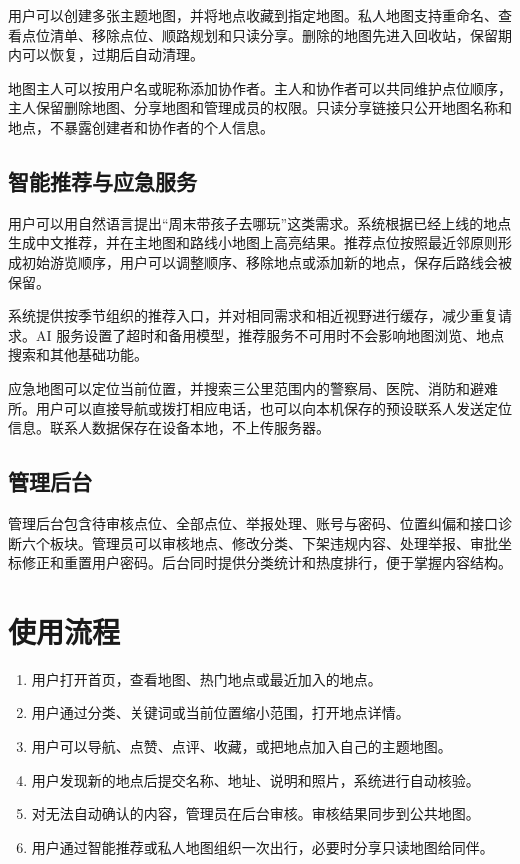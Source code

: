 \documentclass[UTF8,a4paper,12pt]{ctexart}
\begin{document}
用户可以创建多张主题地图，并将地点收藏到指定地图。私人地图支持重命名、查看点位清单、移除点位、顺路规划和只读分享。删除的地图先进入回收站，保留期内可以恢复，过期后自动清理。

地图主人可以按用户名或昵称添加协作者。主人和协作者可以共同维护点位顺序，主人保留删除地图、分享地图和管理成员的权限。只读分享链接只公开地图名称和地点，不暴露创建者和协作者的个人信息。

\subsection{智能推荐与应急服务}

用户可以用自然语言提出“周末带孩子去哪玩”这类需求。系统根据已经上线的地点生成中文推荐，并在主地图和路线小地图上高亮结果。推荐点位按照最近邻原则形成初始游览顺序，用户可以调整顺序、移除地点或添加新的地点，保存后路线会被保留。

系统提供按季节组织的推荐入口，并对相同需求和相近视野进行缓存，减少重复请求。AI 服务设置了超时和备用模型，推荐服务不可用时不会影响地图浏览、地点搜索和其他基础功能。

应急地图可以定位当前位置，并搜索三公里范围内的警察局、医院、消防和避难所。用户可以直接导航或拨打相应电话，也可以向本机保存的预设联系人发送定位信息。联系人数据保存在设备本地，不上传服务器。

\subsection{管理后台}

管理后台包含待审核点位、全部点位、举报处理、账号与密码、位置纠偏和接口诊断六个板块。管理员可以审核地点、修改分类、下架违规内容、处理举报、审批坐标修正和重置用户密码。后台同时提供分类统计和热度排行，便于掌握内容结构。

\section{使用流程}

\begin{enumerate}
  \item 用户打开首页，查看地图、热门地点或最近加入的地点。
  \item 用户通过分类、关键词或当前位置缩小范围，打开地点详情。
  \item 用户可以导航、点赞、点评、收藏，或把地点加入自己的主题地图。
  \item 用户发现新的地点后提交名称、地址、说明和照片，系统进行自动核验。
  \item 对无法自动确认的内容，管理员在后台审核。审核结果同步到公共地图。
  \item 用户通过智能推荐或私人地图组织一次出行，必要时分享只读地图给同伴。
\end{enumerate}
\end{document}
